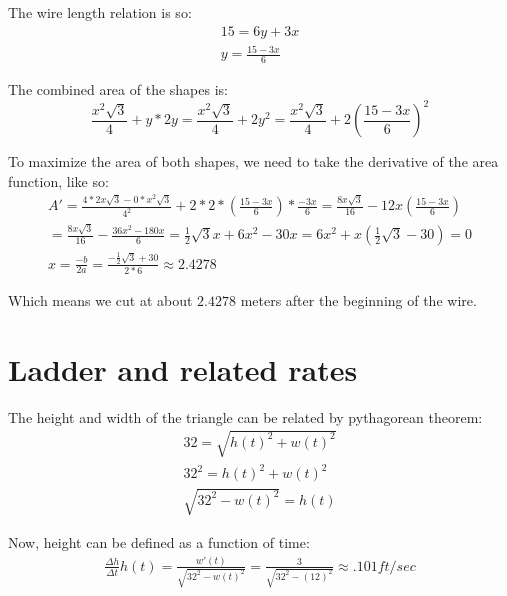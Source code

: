 \documentclass{article}
\begin{document}
The wire length relation is so:
\begin{eqnarray}
	15 = 6y + 3x \\
	y = \frac{15 - 3x}{6}
\end{eqnarray}

The combined area of the shapes is:
\begin{equation}
	\frac{x^2 \sqrt{3}}{4} + y * 2y 
	= \frac{x^2 \sqrt{3}}{4} + 2y^2 
	= \frac{x^2 \sqrt{3}}{4} + 2\left(\frac{15 - 3x}{6}\right)^2 
\end{equation}

To maximize the area of both shapes, we need to take the derivative of the area function, like so:
\begin{eqnarray}
	A' = \frac{4*2x\sqrt{3} - 0*x^2\sqrt{3}}{4^2} + 2 * 2 * \left(\frac{15-3x}{6}\right) * \frac{-3x}{6}
	= \frac{8x\sqrt{3}}{16} - 12x\left(\frac{15-3x}{6}\right) \\
	= \frac{8x\sqrt{3}}{16} - \frac{36x^2 - 180x}{6}
	= \frac{1}{2}\sqrt{3}x + 6x^2 - 30x
	= 6x^2 + x\left(\frac{1}{2}\sqrt{3} - 30\right) = 0 \\
	x = \frac{-b}{2a} = \frac{-\frac{1}{2}\sqrt{3} + 30}{2 * 6} \approx 2.4278
\end{eqnarray}

Which means we cut at about $2.4278$ meters after the beginning of the wire. 

\section{Ladder and related rates}

The height and width of the triangle can be related by pythagorean theorem: 
\begin{eqnarray}
	32 = \sqrt{h(t)^2 + w(t)^2} \\
	32^2 = h(t)^2 + w(t)^2 \\
	\sqrt{32^2 - w(t)^2} = h(t)
\end{eqnarray}

Now, height can be defined as a function of time:
\begin{eqnarray}
	\frac{\Delta h}{\Delta t} h(t) = \frac{w'(t)}{\sqrt{32^2 - w(t)^2}}
	= \frac{3}{\sqrt{32^2 - (12)^2}} \approx .101 ft/sec
\end{eqnarray}
\end{document}
